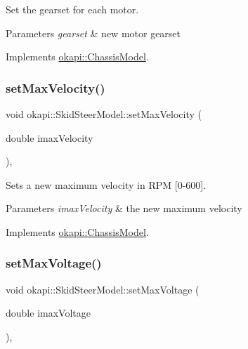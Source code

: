 Set the gearset for each motor.


\begin{DoxyParams}{Parameters}
{\em gearset} & new motor gearset \\
\hline
\end{DoxyParams}


Implements \mbox{\hyperlink{classokapi_1_1ChassisModel_a960d6ce2f21e5832fce1d7566408cb61}{okapi\+::\+Chassis\+Model}}.

\mbox{\label{classokapi_1_1SkidSteerModel_a4beda353f201fa72fc8d31f47a08d473}} 
\subsubsection{\texorpdfstring{setMaxVelocity()}{setMaxVelocity()}}
{\footnotesize\ttfamily void okapi\+::\+Skid\+Steer\+Model\+::set\+Max\+Velocity (\begin{DoxyParamCaption}\item[{double}]{imax\+Velocity }\end{DoxyParamCaption})\hspace{0.3cm}{\ttfamily [override]}, {\ttfamily [virtual]}}

Sets a new maximum velocity in R\+PM \mbox{[}0-\/600\mbox{]}.


\begin{DoxyParams}{Parameters}
{\em imax\+Velocity} & the new maximum velocity \\
\hline
\end{DoxyParams}


Implements \mbox{\hyperlink{classokapi_1_1ChassisModel_ae7fcb4cc95fdd7fd3c8f8388b4a698b2}{okapi\+::\+Chassis\+Model}}.

\mbox{\label{classokapi_1_1SkidSteerModel_ad4dc0f8e3877b23ffb8ae58903bdffb7}} 
\subsubsection{\texorpdfstring{setMaxVoltage()}{setMaxVoltage()}}
{\footnotesize\ttfamily void okapi\+::\+Skid\+Steer\+Model\+::set\+Max\+Voltage (\begin{DoxyParamCaption}\item[{double}]{imax\+Voltage }\end{DoxyParamCaption})\hspace{0.3cm}{\ttfamily [override]}, {\ttfamily [virtual]}}

